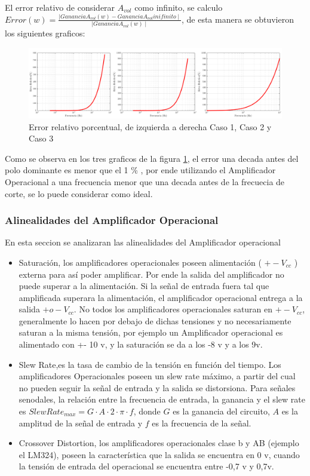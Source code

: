 \documentclass[../../main.tex]{subfiles}
\begin{document}
El error relativo de considerar $A_{vol}$  como infinito, se calculo $ Error(w) = \frac {\mid Ganancia A_{vol}(w) -Ganancia A_{vol} inifinito \mid} {\mid Ganancia A_{vol} (w) \mid }$, de esta manera se obtuvieron los siguientes graficos:

\begin{figure}[H]
\centering
\includegraphics[width=1\textwidth]{imagenes/error_inv.png}
\caption{Error relativo porcentual, de izquierda a derecha Caso 1, Caso 2 y Caso 3} \label{fig=errorInv}
\end{figure}


Como se observa en los tres graficos de la figura \ref{fig=errorInv}, el error una decada antes del polo dominante es menor que el 1 \% , por ende utilizando el Amplificador Operacional a una frecuencia menor que una decada antes de la frecuecia de corte, se lo puede considerar como ideal.
\subsubsection{Alinealidades del Amplificador Operacional}
En esta seccion se analizaran las alinealidades del Amplificador operacional
\begin{itemize}  
\item Saturación, los amplificadores operacionales poseen alimentación ( $+-V_{cc}$ ) externa para así poder amplificar. Por ende la salida del amplificador no puede superar a la alimentación. Si la señal de entrada fuera tal que amplificada superara la alimentación, el amplificador operacional entrega a la salida $+ o -V_{cc}$. No todos los amplificadores operacionales saturan en $+-V_{cc}$, generalmente lo hacen por debajo de dichas tensiones y no necesariamente saturan a la misma tensión, por ejemplo un Amplificador operacional es alimentado con +- 10 v, y la saturación se da a los -8 v y a los 9v.
\item Slew Rate,es la tasa de cambio de la tensión en función del tiempo. Los amplificadores Operacionales poseen un slew rate máximo, a partir del cual no pueden seguir la señal de entrada y la salida se distorsiona. Para señales senodales, la relación entre la frecuencia de entrada, la ganancia y el slew rate es $ SlewRate_{max}=G \cdot A \cdot 2 \cdot \pi \cdot f $, donde $ G $ es la ganancia del circuito, $ A $ es la amplitud de la señal de entrada y $f$ es la frecuencia de la señal.
\item Crossover Distortion, los amplificadores operacionales clase b y AB (ejemplo el LM324), poseen la característica que la salida se encuentra en 0 v, cuando la tensión de entrada del operacional se encuentra entre -0,7 v y 0,7v.
\end{itemize}
\end{document}
